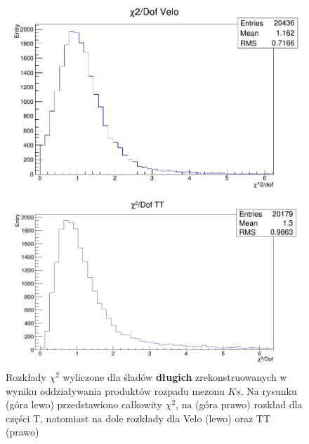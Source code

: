 \begin{figure}[h]
\vspace*{0.5cm} %
\begin{minipage}[t]{0.45\textwidth}
\includegraphics[width=\linewidth]{rozdzial6/KsLL_chi2Velo.png}
\end{minipage}
\hspace{\fill}
\begin{minipage}[t]{0.5\textwidth}
\includegraphics[width=\linewidth]{rozdzial6/KsLL_chi2TT.png}
\end{minipage}
\caption{Rozkłady $\chi^2$ wyliczone dla śladów \textbf{długich} zrekonstruowanych w wyniku oddziaływania produktów rozpadu mezonu $Ks$. Na rysunku (góra lewo) przedstawiono całkowity $\chi^2$, na (góra prawo) rozkład dla części T, natomiast na dole rozkłady dla Velo (lewo) oraz TT (prawo) } \label{chi2KsLL}
\end{figure}

